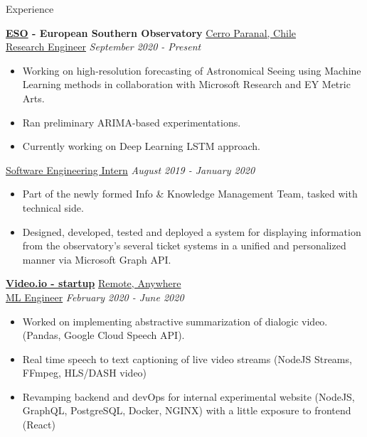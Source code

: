 \documentclass{resume} %
\begin{document}


\begin{rSection}{Experience}

	{\bf \href{https://www.eso.org}{ESO} - European Southern Observatory} \hfill \underline{Cerro Paranal, Chile}
	\\ \underline{Research Engineer} \hfill {\em September 2020 - Present}
	\begin{itemize}\vspace{-0.5em}
		\item Working on high-resolution forecasting of Astronomical Seeing using Machine Learning
			methods in collaboration with Microsoft Research and EY Metric Arts.
		\item Ran preliminary ARIMA-based experimentations.
		\item Currently working on Deep Learning LSTM approach.
	\end{itemize}
	\underline{Software Engineering Intern} \hfill {\em August 2019 - January 2020}
	\begin{itemize}\vspace{-0.5em}
		\item Part of the newly formed Info \& Knowledge Management Team, tasked with technical side.
		\item Designed, developed, tested and deployed a system for displaying information from the observatory's several ticket systems in a unified and personalized manner via Microsoft Graph API.
	\end{itemize}

	{\bf \href{https://video.io/}{Video.io - startup}} \hfill \underline{Remote, Anywhere}
	\\ \underline{ML Engineer} \hfill {\em February 2020 - June 2020}
	\begin{itemize}\vspace{-0.5em}
		\item Worked on implementing abstractive summarization of dialogic video. (Pandas, Google Cloud Speech API).
		\item Real time speech to text captioning of live video streams (NodeJS Streams, FFmpeg, HLS/DASH video)
		\item Revamping backend and devOps for internal experimental website (NodeJS, GraphQL, PostgreSQL, Docker, NGINX) with a little exposure to frontend (React)
	\end{itemize}


\end{rSection}
\end{document}
